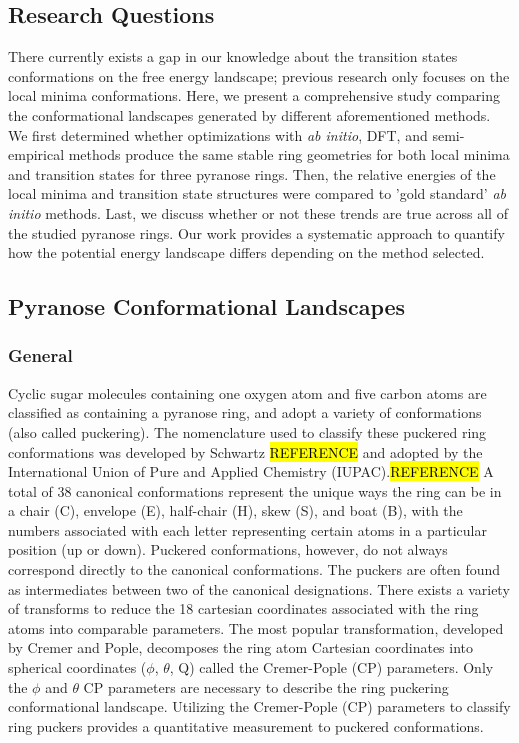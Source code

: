 \documentclass{article}
\begin{document}
\subsection{Research Questions}
There currently exists a gap in our knowledge about the transition states conformations on the free energy landscape; 
previous research only focuses on the local minima conformations. Here, we present a comprehensive study comparing 
the conformational landscapes generated by different aforementioned methods. We first determined whether 
optimizations with \textit{ab initio}, DFT, and semi-empirical methods produce the same stable ring geometries 
for both local minima and transition states for three pyranose rings. Then, the relative energies of the local minima and 
transition state structures were compared to 'gold standard' \textit{ab initio} methods. Last, we discuss 
whether or not these trends are true across all of the studied pyranose rings. Our work provides a systematic
approach to quantify how the potential energy landscape differs depending on the method selected.

\subsection{Pyranose Conformational Landscapes}

\subsubsection{General}
Cyclic sugar molecules containing one oxygen atom and five carbon atoms are classified as containing a pyranose ring, and adopt a variety of conformations
(also called puckering). The nomenclature used to classify these puckered ring conformations was developed by Schwartz \hl{REFERENCE} and adopted by
the International Union of Pure and Applied Chemistry (IUPAC).\hl{REFERENCE} A total of 38 canonical conformations represent the unique ways the ring can
be in a chair (C), envelope (E), half-chair (H), skew (S), and boat (B), with the numbers associated with each letter representing certain atoms in a particular 
position (up or down). Puckered conformations, however, do not always correspond directly to the canonical conformations. The puckers are often found as 
intermediates between two of the canonical designations.\cite{Biarnes2007} There exists a variety of transforms to reduce the 18 cartesian coordinates 
associated with the ring atoms into comparable parameters.\cite{Cremer1975,Hill2007,Berces2001,Khalili2013} The most popular transformation, 
developed by Cremer and Pople, decomposes the ring atom Cartesian coordinates into spherical coordinates ($\phi$, $\theta$, Q) called the Cremer-Pople (CP) 
parameters. Only the $\phi$ and $\theta$ CP parameters are necessary to describe the ring puckering conformational landscape.\cite{Cremer1975} Utilizing 
the Cremer-Pople (CP) parameters to classify ring puckers provides a quantitative measurement to puckered conformations.
\end{document}
